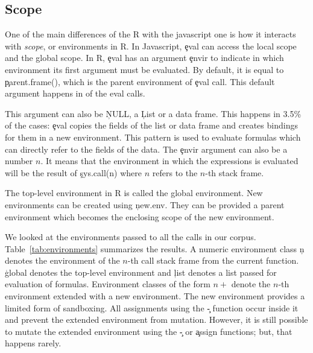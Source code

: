 \documentclass[conference]{IEEEtran}
\begin{document}
\subsection{Scope}

One of the main differences of the R \eval with the javascript one is how it
interacts with \emph{scope}, or environments in R. In Javascript, \c{eval} can
access the local scope and the global scope. In R, \c{eval} has an argument
\c{envir} to indicate in which environment its first argument must be evaluated.
By default, it is equal to \c{parent.frame()}, 
which is the parent environment of \c{eval} call. This default argument
happens in \DefaultEnvirExprPercent of the eval calls.

This argument can also be \c{NULL}, a \c{List} or a data frame. This happens in
3.5\% of the cases: \c{eval} copies the fields of the list or data frame and creates bindings for
them in a new environment. This pattern is used to evaluate formulas which can
directly refer to the fields of the data.
The \c{envir} argument can also be a number $n$. It means that the environment in
which the expressions is evaluated will be the result of \c{sys.call(n)} where
$n$ refers to the $n$-th stack frame.

The top-level environment in R is called the global environment. New
environments can be created using \c{new.env}. They can be provided a parent
environment which becomes the enclosing scope of the new environment.

We looked at the environments passed to all the \eval calls in our corpus.
Table~\ref{tab:environments} summarizes the results. A numeric environment class
\c{n} denotes the environment of the $n$-th call stack frame from the current
function. \c{global} denotes the top-level environment and \c{list} denotes a list
passed for evaluation of formulas. Environment classes of the form $n+$ denote
the $n$-th environment extended with a new environment. The new environment
provides a limited form of sandboxing. All assignments using the \c{\<-}
function occur inside it and prevent the extended environment from
mutation. However, it is still possible to mutate the extended environment
using the \c{\<\<-} or \c{assign} functions; but, that happens rarely.
\end{document}
